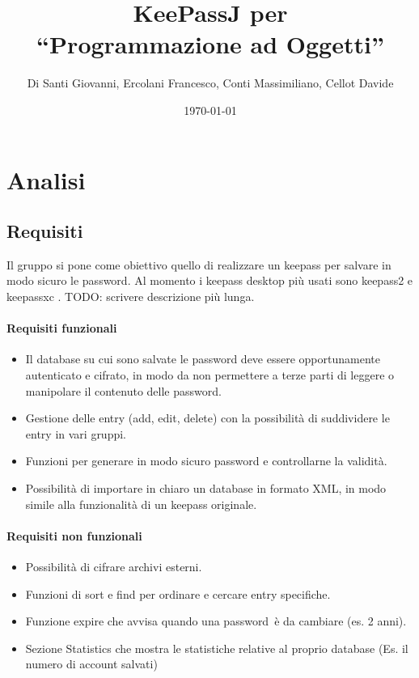 \documentclass[a4paper,12pt]{report}
\title{KeePassJ per\\``Programmazione ad Oggetti''}
\author{Di Santi Giovanni, Ercolani Francesco, Conti Massimiliano, Cellot Davide}
\date{\today}
\begin{document}
 
\maketitle

\tableofcontents

\chapter{Analisi}

\section{Requisiti}

Il gruppo si pone come obiettivo quello di realizzare un keepass per salvare
in modo sicuro le password. Al momento i keepass desktop più usati sono keepass2
\cite{keepass2} e keepassxc \cite{keepassxc}.
TODO: scrivere descrizione più lunga.

\subsubsection{Requisiti funzionali}
\begin{itemize}
  \item Il database su cui sono salvate le password deve essere opportunamente
    autenticato e cifrato, in modo da non permettere a terze parti di leggere
    o manipolare il contenuto delle password.
  \item Gestione delle entry (add, edit, delete) con la possibilità di suddividere
    le entry in vari gruppi.
  \item Funzioni per generare in modo sicuro password e controllarne la validità.
  \item Possibilità di importare in chiaro un database in formato XML, in modo simile
    alla funzionalità di un keepass originale.
  
\end{itemize}

\subsubsection{Requisiti non funzionali}
\begin{itemize}
  \item Possibilità di cifrare archivi esterni.
  \item Funzioni di sort e find per ordinare e cercare entry specifiche.
  \item Funzione expire che avvisa quando una password è da cambiare (es. 2 anni).
  \item Sezione Statistics che mostra le statistiche relative al proprio database (Es. il numero di account salvati)
\end{itemize}
\end{document}
